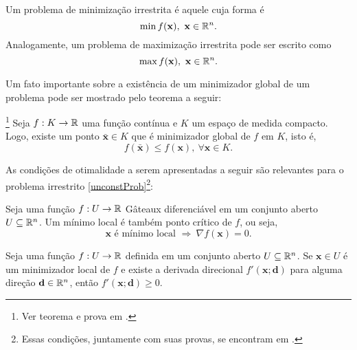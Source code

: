 \begin{definition}
Um problema de minimiza\c{c}\~{a}o irrestrita \'{e} aquele cuja forma \'{e}
\begin{equation}
\label{unconstProb}
\min f(\mathbf{x}),~\mathbf{x} \in \mathbb{R}^{n}.
\end{equation}
Analogamente, um problema de maximiza\c{c}\~{a}o irrestrita pode ser escrito como
\begin{equation}
\max f(\mathbf{x}),~\mathbf{x} \in \mathbb{R}^{n}.
\end{equation}
\end{definition}

Um fato importante sobre a exist\^{e}ncia de um minimizador global de um problema pode ser mostrado pelo teorema a seguir:

\begin{theorem}\footnote{Ver teorema e prova em \cite[p. 33]{guller}.}
Seja $f: K \to \mathbb{R}$ uma fun\c{c}\~{a}o cont\'{i}nua e $K$ um espa\c{c}o de medida compacto. Logo, existe um ponto $\mathbf{\bar{x}} \in K$ que \'{e} minimizador global de $f$ em $K$, isto \'{e},
\begin{equation*}
f(\mathbf{\bar{x}}) \le f(\mathbf{x}),~\forall \mathbf{x} \in K.
\end{equation*} 
\end{theorem}

As condi\c{c}\~{o}es de otimalidade a serem apresentadas a seguir s\~{a}o relevantes para o problema irrestrito \eqref{unconstProb}\footnote{Essas condi\c{c}\~{o}es, juntamente com suas provas, se encontram em \cite[pp. 35-39]{guller}.}:

\begin{theorem}\label{theoCO1}
Seja uma fun\c{c}\~{a}o $f: U \to \mathbb{R}$ G\^{a}teaux diferenci\'{a}vel em um conjunto aberto $U \subseteq \mathbb{R}^{n}$. Um m\'{i}nimo local \'{e} tamb\'{e}m ponto cr\'{i}tico de $f$, ou seja, 
\begin{equation*}
\mathbf{x} \text{ \'{e} m\'{i}nimo local } \Rightarrow ~ \nabla f(\mathbf{x}) = 0.
\end{equation*}
\end{theorem}

\begin{corollary}
Seja uma fun\c{c}\~{a}o $f: U \to \mathbb{R}$ definida em um conjunto aberto $U \subseteq \mathbb{R}^{n}$. Se $\mathbf{x} \in U$ \'{e} um minimizador local de $f$ e existe a derivada direcional $f'(\mathbf{x};\mathbf{d})$ para alguma dire\c{c}\~{a}o $\mathbf{d} \in \mathbb{R}^{n}$, ent\~{a}o $f'(\mathbf{x};\mathbf{d}) \ge 0$.
\end{corollary}


